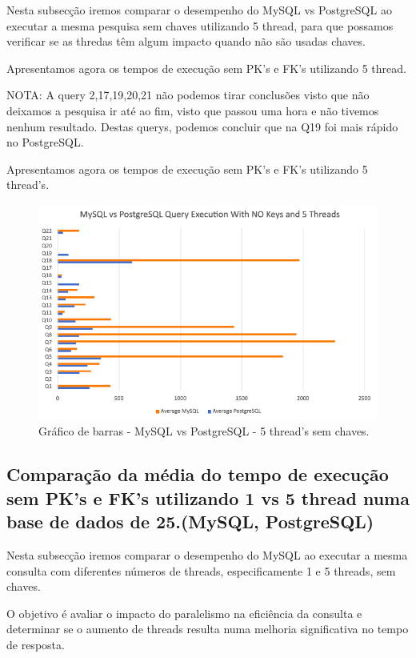 \documentclass{article}
\begin{document}
Nesta subsecção iremos comparar o desempenho do MySQL vs PostgreSQL ao executar a mesma pesquisa sem chaves utilizando 5 thread, para que possamos verificar se as thredas têm algum impacto quando não são usadas chaves.

Apresentamos agora os tempos de execução sem PK's e FK's utilizando 5 thread.

NOTA: A query 2,17,19,20,21 não podemos tirar conclusões visto que não deixamos a pesquisa ir até ao fim, visto que passou uma hora e não tivemos nenhum resultado. Destas querys, podemos concluir que na Q19 foi mais rápido no PostgreSQL.

Apresentamos agora os tempos de execução sem PK's e FK's utilizando 5 thread's.
\begin{figure}[H]
  \centering
  \includegraphics[width=\textwidth]{Graphs/mysqlvspostgres_withoutkeys_fivethreads.png}
  \caption{Gráfico de barras - MySQL vs PostgreSQL - 5 thread's sem chaves.}
  \label{fig:PKCreation2}
\end{figure}



\clearpage
  \subsection{Comparação da média do tempo de execução sem PK's e FK's
  utilizando 1 vs 5 thread numa base de dados de 25.(MySQL, PostgreSQL)}
  
  \quad Nesta subsecção iremos comparar o desempenho do MySQL ao executar a mesma consulta com diferentes números de threads, especificamente 1 e 5 threads, sem chaves. 
  
  O objetivo é avaliar o impacto do paralelismo na eficiência da consulta e determinar se o aumento de threads resulta numa melhoria significativa no tempo de resposta.\\
  
\end{document}

